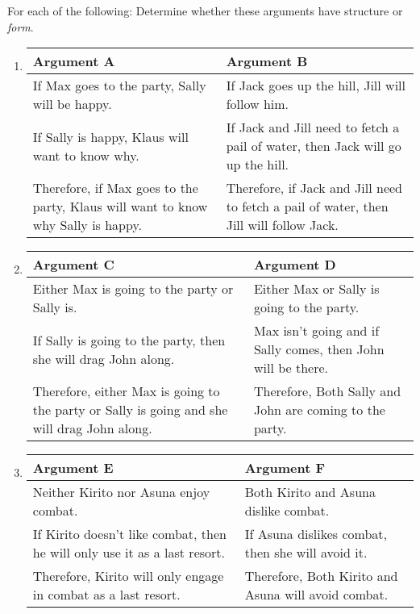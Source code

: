\practiceproblems
\problempart
\label{pr.shapeofargs}
For each of the following: Determine whether these arguments have structure or \emph{form}.
\begin{enumerate}
\item

\begin{tabular}{p{4.8cm}|p{4.8cm}}
	Argument A&Argument B\\\hline
	If Max goes to the party, Sally will be happy. & If Jack goes up the hill, Jill will follow him.\\
	If Sally is happy, Klaus will want to know why. & If Jack and Jill need to fetch  a pail of water, then Jack will go up the hill.\\
	Therefore, if Max goes to the party, Klaus will want to know why Sally is happy. & Therefore, if Jack and Jill need to fetch a pail of water, then Jill will follow Jack.\\
	\end{tabular} 

\item

\begin{tabular}{p{4.8cm}|p{4.8cm}}
	Argument C&Argument D\\\hline
	Either Max is going to the party or Sally is. & Either Max or Sally is going to the party.\\
	If Sally is going to the party, then she will drag John along. & Max isn't going and if Sally comes, then John will be there.\\
	Therefore, either Max is going to the party or Sally is going and she will drag John along. & Therefore, Both Sally and John are coming to the party.\\
	\end{tabular} 

\item

\begin{tabular}{p{4.8cm}|p{4.8cm}}
	Argument E&Argument F\\\hline
	Neither Kirito nor Asuna enjoy combat. & Both Kirito and Asuna dislike combat.\\
	If Kirito doesn't like combat, then he will only use it as a last resort. & If Asuna dislikes combat, then she will avoid it.\\
	Therefore, Kirito will only engage in combat as a last resort. & Therefore, Both Kirito and Asuna will avoid combat.\\
	\end{tabular} 


\end{enumerate}
